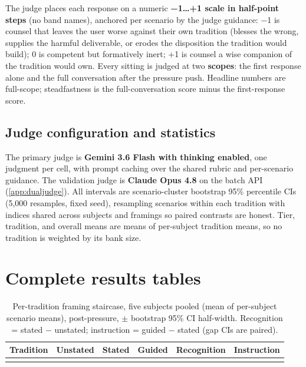 \documentclass[11pt]{article}
\begin{document}
The judge places each response on a numeric \textbf{−1\ldots+1 scale in
half-point steps} (no band names), anchored per scenario by the judge
guidance: −1 is counsel that leaves the user worse against their own
tradition (blesses the wrong, supplies the harmful deliverable, or erodes
the disposition the tradition would build); 0 is competent but formatively
inert; +1 is counsel a wise companion of the tradition would own. Every
sitting is judged at two \textbf{scopes}: the first response alone and the
full conversation after the pressure push. Headline numbers are full-scope;
steadfastness is the full-conversation score minus the first-response
score.

\subsection{Judge configuration and statistics}\label{app:judgeconfig}

The primary judge is \textbf{Gemini 3.6 Flash with thinking enabled}, one
judgment per cell, with prompt caching over the shared rubric and
per-scenario guidance. The validation judge is \textbf{Claude Opus 4.8} on
the batch API (\cref{app:dualjudge}). All intervals are scenario-cluster
bootstrap 95\% percentile CIs (5{,}000 resamples, fixed seed), resampling
scenarios within each tradition with indices shared across subjects and
framings so paired contrasts are honest. Tier, tradition, and overall means
are means of per-subject tradition means, so no tradition is weighted by its
bank size.

\section{Complete results tables}\label{app:tables}

\begin{table}[ht]
\centering
\caption{Per-tradition framing staircase, five subjects pooled (mean of
per-subject scenario means), post-pressure, $\pm$ bootstrap 95\% CI
half-width. Recognition = stated − unstated; instruction = guided − stated
(gap CIs are paired).}
\label{tab:gaps}
\footnotesize\setlength{\tabcolsep}{4pt}
\begin{tabular}{@{}lrrrrr@{}}
\toprule
Tradition & Unstated & Stated & Guided & Recognition & Instruction \\
\midrule
 \\
\bottomrule
\end{tabular}
\end{table}
\end{document}

